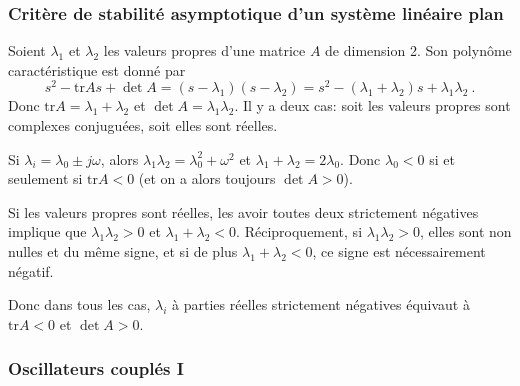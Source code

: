 \hypertarget{answer-crit_stab_dim2}{%
\subsubsection*{Critère de stabilité asymptotique d'un système linéaire
plan}\label{answer-crit_stab_dim2}}


Soient \(\lambda_1\) et \(\lambda_2\) les valeurs propres d'une matrice
\(A\) de dimension 2. Son polynôme caractéristique est donné par \[
s^2 - \text{tr} A s + \det A = (s-\lambda_1)(s-\lambda_2) = s^2 - (\lambda_1+\lambda_2)  s + \lambda_1\lambda_2 \ .
\] Donc \(\text{tr} A = \lambda_1+\lambda_2\) et
\(\det A = \lambda_1\lambda_2\). Il y a deux cas: soit les valeurs
propres sont complexes conjuguées, soit elles sont réelles.

Si \(\lambda_i = \lambda_0 \pm j\omega\), alors
\(\lambda_1\lambda_2=\lambda_0^2+\omega^2\) et
\(\lambda_1+\lambda_2 = 2\lambda_0\). Donc \(\lambda_0<0\) si et
seulement si \(\text{tr} A <0\) (et on a alors toujours \(\det A>0\)).

Si les valeurs propres sont réelles, les avoir toutes deux strictement
négatives implique que \(\lambda_1\lambda_2>0\) et
\(\lambda_1+\lambda_2<0\). Réciproquement, si \(\lambda_1\lambda_2>0\),
elles sont non nulles et du même signe, et si de plus
\(\lambda_1+\lambda_2<0\), ce signe est nécessairement négatif.

Donc dans tous les cas, \(\lambda_i\) à parties réelles strictement
négatives équivaut à \(\text{tr} A <0\) et \(\det A>0\).

\hypertarget{answer-ressort-1}{%
\subsubsection*{Oscillateurs couplés I}\label{answer-ressort-1}}


